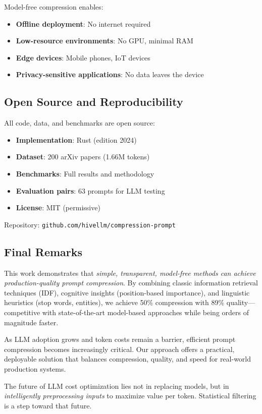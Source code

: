 Model-free compression enables:
\begin{itemize}
    \item \textbf{Offline deployment}: No internet required
    \item \textbf{Low-resource environments}: No GPU, minimal RAM
    \item \textbf{Edge devices}: Mobile phones, IoT devices
    \item \textbf{Privacy-sensitive applications}: No data leaves the device
\end{itemize}

\subsection{Open Source and Reproducibility}

All code, data, and benchmarks are open source:

\begin{itemize}
    \item \textbf{Implementation}: Rust (edition 2024)
    \item \textbf{Dataset}: 200 arXiv papers (1.66M tokens)
    \item \textbf{Benchmarks}: Full results and methodology
    \item \textbf{Evaluation pairs}: 63 prompts for LLM testing
    \item \textbf{License}: MIT (permissive)
\end{itemize}

Repository: \texttt{github.com/hivellm/compression-prompt}

\subsection{Final Remarks}

This work demonstrates that \textit{simple, transparent, model-free methods can achieve production-quality prompt compression}. By combining classic information retrieval techniques (IDF), cognitive insights (position-based importance), and linguistic heuristics (stop words, entities), we achieve 50\% compression with 89\% quality—competitive with state-of-the-art model-based approaches while being orders of magnitude faster.

As LLM adoption grows and token costs remain a barrier, efficient prompt compression becomes increasingly critical. Our approach offers a practical, deployable solution that balances compression, quality, and speed for real-world production systems.

The future of LLM cost optimization lies not in replacing models, but in \textit{intelligently preprocessing inputs} to maximize value per token. Statistical filtering is a step toward that future.
